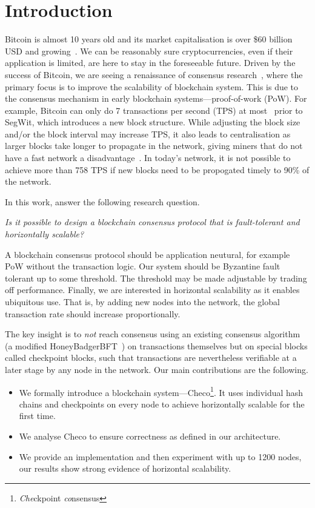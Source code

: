 
\section{Introduction}

Bitcoin is almost 10 years old and its market capitalisation is over \$60 billion USD and growing~\cite{bitcoinmarketcap}.
We can be reasonably sure cryptocurrencies,
even if their application is limited,
are here to stay in the foreseeable future.
Driven by the success of Bitcoin, we are seeing a renaissance of consensus research~\cite{miller2016honey, kogias2016enhancing, kokoris2017omniledger},
where the primary focus is to improve the scalability of blockchain system.
This is due to the consensus mechanism in early blockchain systems---proof-of-work (PoW).
For example, Bitcoin can only do 7 transactions per second (TPS) at most~\cite{vukolic2015quest} prior to SegWit,
which introduces a new block structure.
While adjusting the block size and/or the block interval may increase TPS,
it also leads to centralisation as larger blocks take longer to propagate in the network,
giving miners that do not have a fast network a disadvantage~\cite{croman2016scaling}.
In today's network, it is not possible to achieve more than 758 TPS
if new blocks need to be propogated timely to 90\% of the network.

In this work, answer the following research question.
\begin{displayquote}
\emph{Is it possible to design a blockchain consensus protocol that is fault-tolerant and horizontally scalable?}
\end{displayquote}
A blockchain consensus protocol should be application neutural,
for example PoW without the transaction logic.
Our system should be Byzantine fault tolerant up to some threshold.
The threshold may be made adjustable by trading off performance.
Finally, we are interested in horizontal scalability as it enables ubiquitous use.
That is, by adding new nodes into the network, the global transaction rate should increase proportionally.

The key insight is to \emph{not} reach consensus using an existing consensus algorithm (a modified HoneyBadgerBFT~\cite{miller2016honey}) on transactions themselves but on special blocks called checkpoint blocks,
such that transactions are nevertheless verifiable at a later stage by any node in the network.
Our main contributions are the following.
\begin{itemize}
    \item We formally introduce a blockchain system---Checo\footnote{\emph{Che}ckpoint \emph{co}nsensus}.
        It uses individual hash chains and checkpoints on every node to achieve
        horizontally scalable for the first time.
    \item We analyse Checo to ensure correctness as defined in our architecture.
    \item We provide an implementation and then experiment with up to 1200 nodes,
        our results show strong evidence of horizontal scalability.
\end{itemize}

